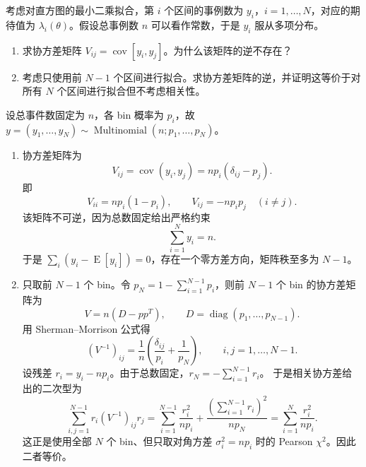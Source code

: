 \begin{question}
考虑对直方图的最小二乘拟合，第 \(i\) 个区间的事例数为
\(y_i\)，\(i=1,\ldots,N\)，对应的期待值为
\(\lambda_i(\theta)\)。假设总事例数 \(n\) 可以看作常数，于是 \(y_i\)
服从多项分布。

\begin{enumerate}
\item
  求协方差矩阵
  \(V_{ij}=\operatorname{cov}[y_i,y_j]\)。为什么该矩阵的逆不存在？
\item
  考虑只使用前 \(N-1\)
  个区间进行拟合。求协方差矩阵的逆，并证明这等价于对所有 \(N\)
  个区间进行拟合但不考虑相关性。
\end{enumerate}
\begin{solution}
设总事件数固定为 \(n\)，各 bin 概率为 \(p_i\)，故
\(y=(y_1,\ldots,y_N)\sim\operatorname{Multinomial}(n;p_1,\ldots,p_N)\)。

\begin{enumerate}
\item 协方差矩阵为
\[
V_{ij}=\operatorname{cov}(y_i,y_j)
=n p_i(\delta_{ij}-p_j).
\]
即
\[
V_{ii}=np_i(1-p_i),
\qquad
V_{ij}=-np_ip_j\quad(i\ne j).
\]
该矩阵不可逆，因为总数固定给出严格约束
\[
\sum_{i=1}^N y_i=n.
\]
于是 \(\sum_i (y_i-\operatorname{E}[y_i])=0\)，存在一个零方差方向，矩阵秩至多为
\(N-1\)。

\item 只取前 \(N-1\) 个 bin。令 \(p_N=1-\sum_{i=1}^{N-1}p_i\)，则前
\(N-1\) 个 bin 的协方差矩阵为
\[
V=n(D-pp^T),
\qquad
D=\operatorname{diag}(p_1,\ldots,p_{N-1}).
\]
用 Sherman--Morrison 公式得
\[
(V^{-1})_{ij}=\frac1n\left(\frac{\delta_{ij}}{p_i}+\frac1{p_N}\right),
\qquad i,j=1,\ldots,N-1.
\]
设残差 \(r_i=y_i-np_i\)。由于总数固定，\(r_N=-\sum_{i=1}^{N-1}r_i\)。
于是相关协方差给出的二次型为
\[
\sum_{i,j=1}^{N-1}r_i(V^{-1})_{ij}r_j
=\sum_{i=1}^{N-1}\frac{r_i^2}{np_i}
+\frac{(\sum_{i=1}^{N-1}r_i)^2}{np_N}
=\sum_{i=1}^N\frac{r_i^2}{np_i}.
\]
这正是使用全部 \(N\) 个 bin、但只取对角方差
\(\sigma_i^2=np_i\) 时的 Pearson \(\chi^2\)。因此二者等价。
\end{enumerate}
\end{solution}
\end{question}



